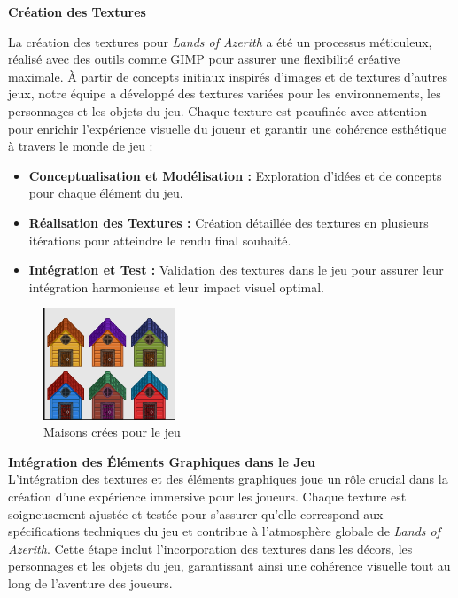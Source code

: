 \textbf{Création des Textures}
\vspace*{0.2cm}

La création des textures pour \textit{Lands of Azerith} a été un processus méticuleux, réalisé avec des outils comme GIMP pour assurer une flexibilité créative maximale.
À partir de concepts initiaux inspirés d'images et de textures d'autres jeux, notre équipe a développé des textures variées pour les environnements, les personnages et les objets du jeu.
Chaque texture est peaufinée avec attention pour enrichir l'expérience visuelle du joueur et garantir une cohérence esthétique à travers le monde de jeu :
\\

\begin{itemize}

      \item \textbf{Conceptualisation et Modélisation :} Exploration d'idées et de concepts pour chaque élément du jeu.
            \\

      \item \textbf{Réalisation des Textures :} Création détaillée des textures en plusieurs itérations pour atteindre le rendu final souhaité.
            \\

      \item \textbf{Intégration et Test :} Validation des textures dans le jeu pour assurer leur intégration harmonieuse et leur impact visuel optimal.
            \\

\end{itemize}

\begin{figure}[H]
      \centering
      \includegraphics[width=0.35\textwidth]{assets/maison.png}
      \caption{Maisons crées pour le jeu}
      \label{fig:maison}
\end{figure}

\textbf{Intégration des Éléments Graphiques dans le Jeu}
\\

L'intégration des textures et des éléments graphiques joue un rôle crucial dans la création d'une expérience immersive pour les joueurs.
Chaque texture est soigneusement ajustée et testée pour s'assurer qu'elle correspond aux spécifications techniques du jeu et contribue à l'atmosphère globale de \textit{Lands of Azerith}.
Cette étape inclut l'incorporation des textures dans les décors, les personnages et les objets du jeu, garantissant ainsi une cohérence visuelle tout au long de l'aventure des joueurs.
\\

